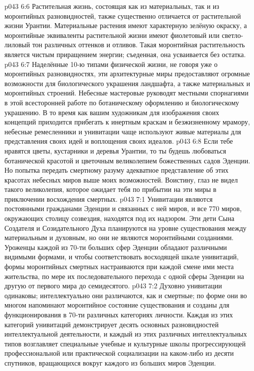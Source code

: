 \vs p043 6:6 Растительная жизнь, состоящая как из материальных, так и из моронтийных разновидностей, также существенно отличается от растительной жизни Урантии. Материальные растения имеют характерную зелёную окраску, а моронтийные эквиваленты растительной жизни имеют фиолетовый или светло\hyp{}лиловый тон различных оттенков и отливов. Такая моронтийная растительность является чистым приращением энергии; съеденная, она усваивается без остатка.
\vs p043 6:7 Наделённые 10-ю типами физической жизни, не говоря уже о моронтийных разновидностях, эти архитектурные миры предоставляют огромные возможности для биологического украшения ландшафта, а также материальных и моронтийных строений. Небесные мастеровые руководят местными спорнагиями в этой всесторонней работе по ботаническому оформлению и биологическому украшению. В то время как вашим художникам для изображения своих концепций приходится прибегать к инертным краскам и безжизненному мрамору, небесные ремесленники и унивитации чаще используют живые материалы для представления своих идей и воплощения своих идеалов.
\vs p043 6:8 Если тебе нравятся цветы, кустарники и деревья Урантии, то ты будешь любоваться ботанической красотой и цветочным великолепием божественных садов Эденции. Но попытка передать смертному разуму адекватное представление об этих красотах небесных миров выше моих возможностей. Воистину, глаз не видел такого великолепия, которое ожидает тебя по прибытии на эти миры в приключении восхождения смертных.
\vs p043 7:1 Унивитации являются постоянными гражданами Эденции и связанных с ней миров, и все 770 миров, окружающих столицу созвездия, находятся под их надзором. Эти дети Сына Создателя и Созидательного Духа планируются на уровне существования между материальным и духовным, но они не являются моронтийными созданиями. Уроженцы каждой из 70-ти больших сфер Эденции обладают различными видимыми формами, и чтобы соответствовать восходящей шкале унивитаций, формы моронтийных смертных настраиваются при каждой смене ими места жительства, по мере их последовательного перехода с одной сферы Эденции на другую от первого мира до семидесятого.
\vs p043 7:2 Духовно унивитации одинаковы; интеллектуально они различаются, как и смертные; по форме они во многом напоминают моронтийное состояние существования и созданы для функционирования в 70-ти различных категориях личности. Каждая из этих категорий унивитаций демонстрирует десять основных разновидностей интеллектуальной деятельности, и каждый из этих различных интеллектуальных типов возглавляет специальные учебные и культурные школы прогрессирующей профессиональной или практической социализации на каком\hyp{}либо из десяти спутников, вращающихся вокруг каждого из больших миров Эденции.
